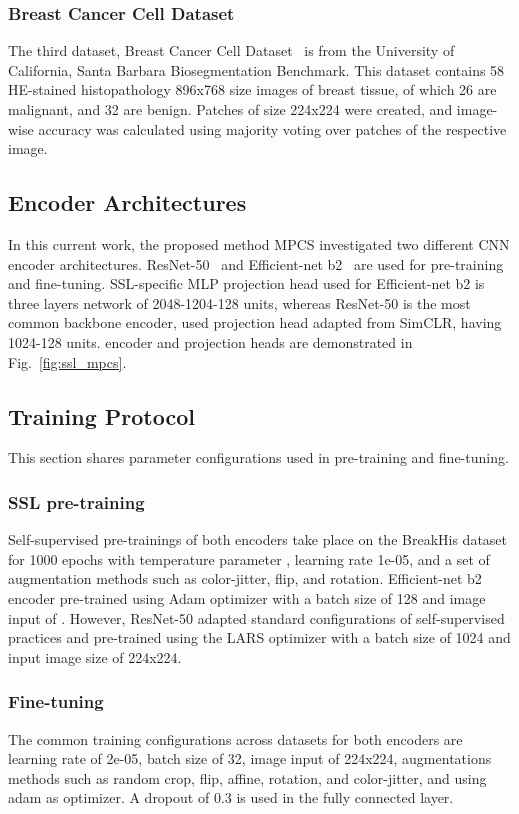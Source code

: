 \documentclass[conference]{IEEEtran}
\begin{document}
\subsubsection{Breast Cancer Cell Dataset}
The third dataset, Breast Cancer Cell Dataset~\cite{gelasca2008evaluation} is from the University of California, Santa Barbara Biosegmentation Benchmark. This dataset contains 58 HE-stained histopathology 896x768 size images of breast tissue, of which 26 are malignant, and 32 are benign. Patches of size 224x224 were created, and image-wise accuracy was calculated using majority voting over patches of the respective image. 
\subsection{Encoder Architectures}
In this current work, the proposed method MPCS investigated two different CNN encoder architectures. ResNet-50~\cite{yu2017dilated} and Efficient-net b2~\cite{tan2019efficientnet} are used for pre-training and fine-tuning. SSL-specific MLP projection head used for Efficient-net b2 is three layers network of 2048-1204-128 units, whereas ResNet-50 is the most common backbone encoder, used projection head adapted from SimCLR, having 1024-128 units. encoder and projection heads are demonstrated in Fig.~\ref{fig:ssl_mpcs}.
\subsection{Training Protocol}
This section shares parameter configurations used in pre-training and fine-tuning. 
\subsubsection{SSL pre-training}
Self-supervised pre-trainings of both encoders take place on the BreakHis dataset for 1000 epochs with temperature parameter , learning rate 1e-05, and a set of augmentation methods such as color-jitter, flip, and rotation. Efficient-net b2 encoder pre-trained using Adam optimizer with a batch size of 128 and image input of . However, ResNet-50 adapted standard configurations of self-supervised practices and pre-trained using the LARS optimizer with a batch size of 1024 and input image size of 224x224.
\subsubsection{Fine-tuning}
The common training configurations across datasets for both encoders are learning rate of 2e-05, batch size of 32, image input of 224x224, augmentations methods such as random crop, flip, affine, rotation, and color-jitter, and using adam as optimizer. A dropout of 0.3 is used in the fully connected layer.
\end{document}
